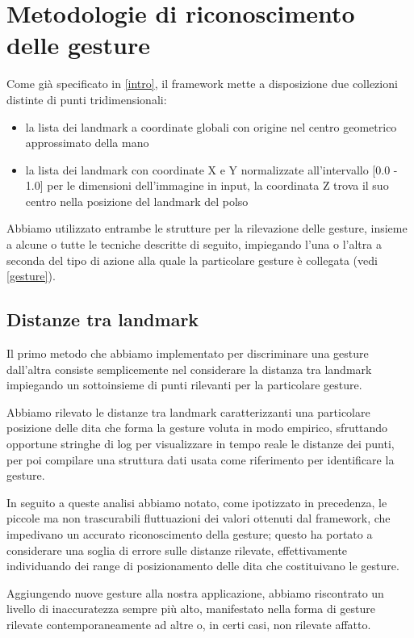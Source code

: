 \chapter{Metodologie di riconoscimento delle gesture}

Come già specificato in \ref{intro}, il framework mette a disposizione due collezioni distinte di punti tridimensionali: 
\begin{itemize}
    \item la lista dei landmark a coordinate globali con origine nel centro geometrico approssimato della mano
    \item la lista dei landmark con coordinate X e Y normalizzate all'intervallo [0.0 - 1.0] per le dimensioni dell'immagine in input, la coordinata Z trova il suo centro nella posizione del landmark del polso
\end{itemize}

Abbiamo utilizzato entrambe le strutture per la rilevazione delle gesture, insieme a alcune o tutte le tecniche descritte di seguito, impiegando l'una o l'altra a seconda del tipo di azione alla quale la particolare gesture è collegata (vedi \ref{gesture}).

\section{Distanze tra landmark}

Il primo metodo che abbiamo implementato per discriminare una gesture dall'altra consiste semplicemente nel considerare la distanza tra landmark impiegando un sottoinsieme di punti rilevanti per la particolare gesture.

Abbiamo rilevato le distanze tra landmark caratterizzanti una particolare posizione delle dita che forma la gesture voluta in modo empirico, sfruttando opportune stringhe di log per visualizzare in tempo reale le distanze dei punti, per poi compilare una struttura dati usata come riferimento per identificare la gesture.

In seguito a queste analisi abbiamo notato, come ipotizzato in precedenza, le piccole ma non trascurabili fluttuazioni dei valori ottenuti dal framework, che impedivano un accurato riconoscimento della gesture; questo ha portato a considerare una soglia di errore sulle distanze rilevate, effettivamente individuando dei range di posizionamento delle dita che costituivano le gesture.

Aggiungendo nuove gesture alla nostra applicazione, abbiamo riscontrato un livello di inaccuratezza sempre più alto, manifestato nella forma di gesture rilevate contemporaneamente ad altre o, in certi casi, non rilevate affatto.

